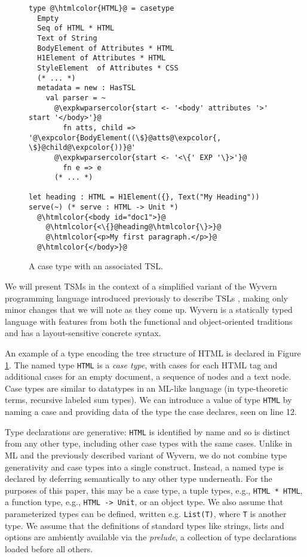 \documentclass{sig-alternate}
\newcommand{\htmlcolor}[1]{\textcolor[HTML]{339933}{#1}}
\newcommand{\expkwparsercolor}[1]{\textcolor[HTML]{336699}{#1}}
\newcommand{\expcolor}[1]{\textcolor[HTML]{FF0033}{#1}}
\newcommand{\mycaption}[1]{\vspace{-4px}\caption{#1}\vspace{-2px}}
\begin{document}
\begin{figure}[t!]
\begin{lstlisting}[style=wyvern]
type @\htmlcolor{HTML}@ = casetype 
  Empty
  Seq of HTML * HTML 
  Text of String
  BodyElement of Attributes * HTML
  H1Element of Attributes * HTML
  StyleElement  of Attributes * CSS
  (* ... *)
  metadata = new : HasTSL
    val parser = ~
      @\expkwparsercolor{start <- '<body' attributes '>' start '</body>'}@
        fn atts, child => '@\expcolor{BodyElement((\$}@atts@\expcolor{, \$}@child@\expcolor{))}@'
      @\expkwparsercolor{start <- '<\{' EXP '\}>'}@
        fn e => e
      (* ... *)

let heading : HTML = H1Element({}, Text("My Heading"))
serve(~) (* serve : HTML -> Unit *)
  @\htmlcolor{<body id="doc1">}@
    @\htmlcolor{<\{}@heading@\htmlcolor{\}>}@
    @\htmlcolor{<p>My first paragraph.</p>}@
  @\htmlcolor{</body>}@
\end{lstlisting}
\mycaption{A case type with an associated TSL.}
\label{f-htmltype}
\end{figure}
We will present TSMs in the context of a simplified variant of the Wyvern programming language introduced previously to describe TSLs  \cite{TSLs}, making only minor changes that we will note as they come up. Wyvern is a statically typed  language with features from both the functional and object-oriented traditions and has a layout-sensitive concrete syntax. 

An example of a type encoding the tree structure of HTML is declared in Figure \ref{f-htmltype}. The named type \verb|HTML| is a \emph{case type}, with cases for each HTML tag and additional cases for an empty document, a sequence of nodes and a text node. Case types are similar to datatypes in an ML-like language (in type-theoretic terms, recursive labeled sum types). 
We can introduce a value of type \verb|HTML| by naming a case and providing data of the type the case declares, seen on line 12.

Type declarations are generative: \verb|HTML| is identified by name and so is distinct from any other type, including other case types with the same cases. Unlike in ML and the previously described variant of Wyvern, we do not combine type generativity and case types into a single construct. Instead, a named type is declared by deferring semantically to any other type underneath. For the purposes of this paper, this may be a  case type, a tuple types, e.g., \verb|HTML * HTML|, a function type, e.g., \verb|HTML -> Unit|, or an object type. We also assume that parameterized types can be defined, written e.g. \verb|List(T)|, where \verb|T| is another type. 
We assume that the definitions of standard  types like strings, lists and options are ambiently available via the \emph{prelude}, a collection of type declarations loaded before all others. 
\end{document}
